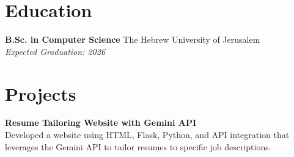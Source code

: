 \documentclass[a4paper,10pt]{article}
\begin{document}
\section*{Education}
\textbf{B.Sc. in Computer Science} \hfill The Hebrew University of Jerusalem \\
\textit{Expected Graduation: 2026} \\



\section*{Projects}
\textbf{Resume Tailoring Website with Gemini API} \\
Developed a website using HTML, Flask, Python, and API integration that leverages the Gemini API to tailor resumes to specific job descriptions.
\end{document}
